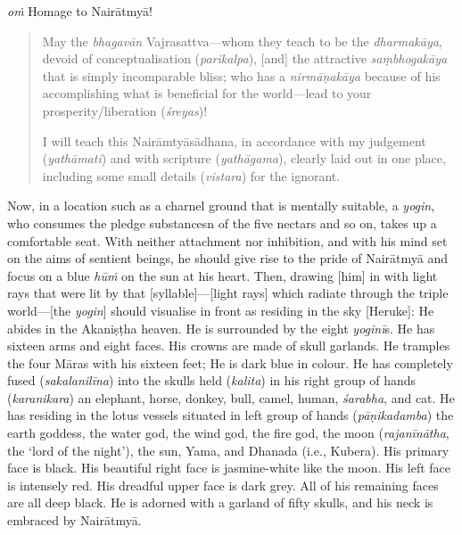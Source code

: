 \documentclass[naipra.tex]{subfiles}
\begin{document}
\noindent \emph{oṁ} Homage to Nairātmyā!

\begin{quote}
	May the \emph{bhagavān} Vajrasattva—whom they teach to be the \emph{dharmakāya}, devoid of conceptualisation (\emph{parikalpa}), [and] the attractive \emph{saṃbhogakāya} that is simply incomparable bliss; who has a \emph{nirmāṇakāya} because of his accomplishing what is beneficial for the world—lead to your prosperity/liberation (\emph{śreyas})!

	I will teach this Nairāmtyāsādhana, in accordance with my judgement (\emph{yathāmati}) and with scripture (\emph{yathāgama}), clearly laid out in one place, including some small details (\emph{vistara}) for the ignorant.
\end{quote}

Now, in a location such as a charnel ground that is mentally suitable, a \emph{yogin}, who consumes the pledge substancesn of the five nectars and so on, takes up a comfortable seat.
With neither attachment nor inhibition, and with his mind set on the aims of sentient beings, he should give rise to the pride of Nairātmyā and focus on a blue \emph{hūṁ} on the sun at his heart.
Then, drawing [him] in with light rays that were lit by that [syllable]—[light rays] which radiate through the triple world—[the \emph{yogin}] should visualise in front as residing in the sky [Heruke]:
He abides in the Akaniṣṭha heaven.
He is surrounded by the eight \emph{yoginī}s.
He has sixteen arms and eight faces.
His crowns are made of skull garlands.
He tramples the four Māras with his sixteen feet;
He is dark blue in colour.
He has completely fused (\emph{sakalanilīna}) into the skulls held (\emph{kalita}) in his right group of hands (\emph{karanikara}) an elephant, horse, donkey, bull, camel, human, \emph{śarabha}, and cat.
He has residing in the lotus vessels situated in left group of hands (\emph{pāṇikadamba}) the earth goddess, the water god, the wind god, the fire god, the moon (\emph{rajanīnātha}, the `lord of the night'), the sun, Yama, and Dhanada (i.e., Kubera).
His primary face is black.
His beautiful right face is jasmine-white like the moon.
His left face is intensely red.
His dreadful upper face is dark grey.
All of his remaining faces are all deep black.
He is adorned with a garland of fifty skulls, and his neck is embraced by Nairātmyā. 
\end{document}
